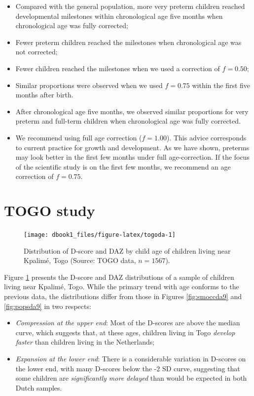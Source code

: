 \documentclass[
]{book}
\begin{document}
\begin{itemize}
\item
  Compared with the general population, more very preterm children reached developmental milestones within chronological age five months when chronological age was fully corrected;
\item
  Fewer preterm children reached the milestones when chronological age was not corrected;
\item
  Fewer children reached the milestones when we used a correction of \(f = 0.50\);
\item
  Similar proportions were observed when we used \(f = 0.75\) within the first five months after birth.
\item
  After chronological age five months, we observed similar proportions for very preterm and full-term children when chronological age was fully corrected.
\item
  We recommend using full age correction (\(f = 1.00\)). This advice corresponds to current practice for growth and development. As we have shown, preterms may look better in the first few months under full age-correction. If the focus of the scientific study is on the first few months, we recommend an age correction of \(f = 0.75\).
\end{itemize}

\hypertarget{sec:togo}{%
\section{TOGO study}\label{sec:togo}}

\begin{figure}

{\centering \texttt{[image: dbook1\_files/figure-latex/togoda-1]} 

}

\caption{Distribution of D-score and DAZ by child age of children living near Kpalimé, Togo (Source: TOGO data, \(n = 1567\)).}\label{fig:togoda}
\end{figure}



Figure \ref{fig:togoda} presents the D-score and DAZ distributions of a sample of children living near Kpalimé, Togo. While the primary trend with age conforms to the previous data, the distributions differ from those in Figures \ref{fig:smoccda9} and \ref{fig:popsda9} in two respects:

\begin{itemize}
\item
  \emph{Compression at the upper end}: Most of the D-scores are above the median curve, which suggests that, at these ages, children living in Togo \emph{develop faster} than children living in the Netherlands;
\item
  \emph{Expansion at the lower end}: There is a considerable variation in D-scores on the lower end, with many D-scores below the -2 SD curve, suggesting that some children are \emph{significantly more delayed} than would be expected in both Dutch samples.
\end{itemize}
\end{document}

